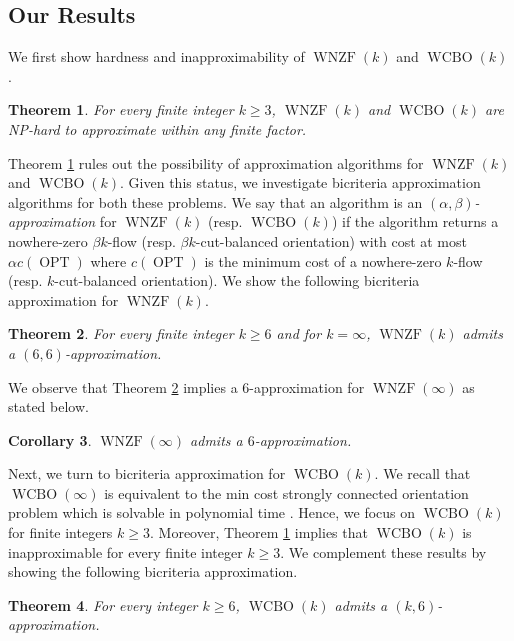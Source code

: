 \documentclass[11pt]{article}
\newtheorem{theorem}{Theorem}
\newtheorem{corollary}[theorem]{Corollary}
\DeclareMathOperator{\opt}{OPT}
\begin{document}
\subsection{Our Results}
We first show hardness and inapproximability of $\operatorname{WNZF}(k)$ and $\operatorname{WCBO}(k)$. 
\begin{theorem}\label{thm:hardness-WNZF-WCBO}
    For every finite integer $k\ge 3$, $\operatorname{WNZF}(k)$ and $\operatorname{WCBO}(k)$ are NP-hard to approximate within any finite factor.
\end{theorem}

Theorem \ref{thm:hardness-WNZF-WCBO} rules out the possibility of approximation algorithms for $\operatorname{WNZF}(k)$ and $\operatorname{WCBO}(k)$. Given this status, we investigate bicriteria approximation algorithms for both these problems. We say that an algorithm is an \emph{$(\alpha,\beta)$-approximation} for $\operatorname{WNZF}(k)$ (resp. $\operatorname{WCBO}(k)$) if the algorithm returns a nowhere-zero $\beta k$-flow (resp. $\beta k$-cut-balanced orientation) with cost at most $\alpha c(\opt)$ where $c(\opt)$ is the minimum cost of a nowhere-zero $k$-flow (resp. $k$-cut-balanced orientation). We show the following bicriteria approximation for $\operatorname{WNZF}(k)$. 
\begin{theorem}\label{thm:approx-nwz-kflow}
For every finite integer $k\ge 6$ and for $k=\infty$, $\operatorname{WNZF}(k)$ admits a $(6,6)$-approximation. 
\end{theorem}
We observe that Theorem \ref{thm:approx-nwz-kflow} implies a $6$-approximation for $\operatorname{WNZF}(\infty)$ as stated below. 
\begin{corollary}\label{cor:approx-nwz-flow}
$\operatorname{WNZF}(\infty)$ admits a $6$-approximation. 
\end{corollary}


Next, we turn to bicriteria approximation for $\operatorname{WCBO}(k)$. We recall that $\operatorname{WCBO}(\infty)$ is equivalent to the min cost strongly connected orientation problem which is solvable in polynomial time \cite{younger1983integer, edmonds1977min}. Hence, we focus on $\operatorname{WCBO}(k)$ for finite integers $k\ge 3$. 
Moreover, Theorem \ref{thm:hardness-WNZF-WCBO} implies that $\operatorname{WCBO}(k)$ is inapproximable for every finite integer $k\ge 3$. We complement these results by showing the following bicriteria approximation. 
\begin{theorem}\label{thm:approx-cut-balanced}
For every integer $k\ge 6$, $\operatorname{WCBO}(k)$ admits a $(k,6)$-approximation. 
\end{theorem}
\end{document}
